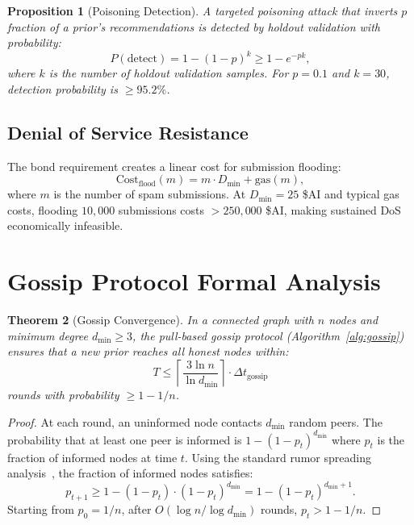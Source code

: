 \documentclass[11pt]{article}
\newtheorem{theorem}{Theorem}
\newtheorem{proposition}[theorem]{Proposition}
\begin{document}
\begin{proposition}[Poisoning Detection]
A targeted poisoning attack that inverts $p$ fraction of a prior's
recommendations is detected by holdout validation with probability:
\begin{equation}
    P(\text{detect}) = 1 - (1 - p)^k \geq 1 - e^{-pk},
\end{equation}
where $k$ is the number of holdout validation samples. For $p = 0.1$ and
$k = 30$, detection probability is $\geq 95.2\%$.
\end{proposition}

\subsection{Denial of Service Resistance}

The bond requirement creates a linear cost for submission flooding:
\begin{equation}
    \text{Cost}_{\text{flood}}(m) = m \cdot D_{\min} + \text{gas}(m),
\end{equation}
where $m$ is the number of spam submissions. At $D_{\min} = 25$ \$AI and
typical gas costs, flooding $10{,}000$ submissions costs $> 250{,}000$ \$AI,
making sustained DoS economically infeasible.

\section{Gossip Protocol Formal Analysis}
\label{app:gossip}

\begin{theorem}[Gossip Convergence]
In a connected graph with $n$ nodes and minimum degree $d_{\min} \geq 3$, the
pull-based gossip protocol (Algorithm~\ref{alg:gossip}) ensures that a new
prior reaches all honest nodes within:
\begin{equation}
    T \leq \left\lceil \frac{3 \ln n}{\ln d_{\min}} \right\rceil \cdot \Delta t_{\text{gossip}}
\end{equation}
rounds with probability $\geq 1 - 1/n$.
\end{theorem}

\begin{proof}
At each round, an uninformed node contacts $d_{\min}$ random peers. The
probability that at least one peer is informed is $1 - (1 - p_t)^{d_{\min}}$
where $p_t$ is the fraction of informed nodes at time $t$. Using the standard
rumor spreading analysis~\cite{demers1987epidemic}, the fraction of informed
nodes satisfies:
\begin{equation}
    p_{t+1} \geq 1 - (1 - p_t) \cdot (1 - p_t)^{d_{\min}} = 1 - (1 - p_t)^{d_{\min}+1}.
\end{equation}
Starting from $p_0 = 1/n$, after $O(\log n / \log d_{\min})$ rounds, $p_t > 1 - 1/n$.
\end{proof}
\end{document}
